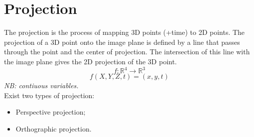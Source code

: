 \section{Projection}
The projection is the process of mapping 3D points (+time) to 2D points. The projection of a 3D point onto the image plane is defined by a line that passes through the point and the center of projection. The intersection of this line with the image plane gives the 2D projection of the 3D point. 
\[
    f: \mathbb{R}^4 \rightarrow \mathbb{R}^3    
\]
\[
    f(X,Y,Z,t) = (x,y,t)
\]
\textit{NB: contiuous variables.}       
\\
Exist two types of projection:
\begin{itemize}
    \item Perspective projection;
    \item Orthographic projection.
\end{itemize}
